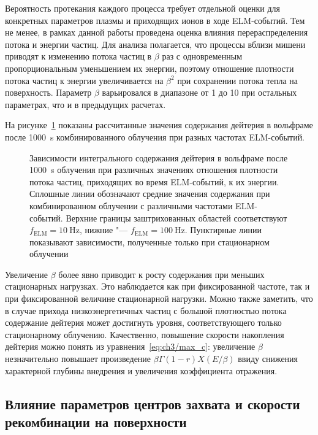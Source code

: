 Вероятность протекания каждого процесса требует отдельной оценки для конкретных параметров плазмы и приходящих ионов в ходе ELM-событий. Тем не менее, в рамках данной работы проведена оценка влияния перераспределения потока и энергии частиц. Для анализа полагается, что процессы вблизи мишени приводят к изменению потока частиц в \( \beta \) раз с одновременным пропорциональным уменьшением их энергии, поэтому отношение плотности потока частиц к энергии увеличивается на $\beta^2$ при сохранении потока тепла на поверхность. Параметр $\beta$ варьировался в диапазоне от 1 до 10 при остальных параметрах, что и в предыдущих расчетах. 

На рисунке~\cref{fig:ch3/beta_var} показаны рассчитанные значения содержания дейтерия в вольфраме после \SI{1000}{\second} комбинированного облучения при разных частотах ELM-событий. 
\begin{figure}[bt]
	\caption{Зависимости интегрального содержания дейтерия в вольфраме после \SI{1000}{\second} облучения при различных значениях отношения плотности потока частиц, приходящих во время ELM-событий, к их энергии. Сплошные линии обозначают средние значения содержания при комбинированном облучении с различными частотами ELM-событий. Верхние границы заштрихованных областей соответствуют \(f_\mathrm{ELM} = \SI{10}{\hertz}\), нижние "--- \(f_\mathrm{ELM} = \SI{100}{\hertz}\). Пунктирные линии показывают зависимости, полученные только при стационарном облучении}\label{fig:ch3/beta_var}
\end{figure}
Увеличение $\beta$ более явно приводит к росту содержания при меньших стационарных нагрузках. Это наблюдается как при фиксированной частоте, так и при фиксированной величине стационарной нагрузки. Можно также заметить, что в случае прихода низкоэнергетичных частиц с большой плотностью потока содержание дейтерия может достигнуть уровня, соответствующего только стационарному облучению. Качественно, повышение скорости накопления дейтерия можно понять из уравнения~\cref{eq:ch3/max_c}: увеличение $\beta$ незначительно повышает произведение $\beta\Gamma (1-r) X(E/\beta)$ ввиду снижения характерной глубины внедрения и увеличения коэффициента отражения. 

\subsection{Влияние параметров центров захвата и скорости рекомбинации на поверхности}

